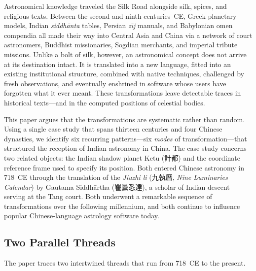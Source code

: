 \documentclass[10pt,a4paper]{article}
\newcommand{\zh}[1]{#1}
\begin{document}
Astronomical knowledge traveled the Silk Road alongside silk, spices, and
religious texts.  Between the second and ninth centuries~CE, Greek planetary
models, Indian \textit{siddh\=anta} tables, Persian \textit{z\={\i}j} manuals,
and Babylonian omen compendia all made their way into Central Asia and China via
a network of court astronomers, Buddhist missionaries, Sogdian merchants, and
imperial tribute missions.  Unlike a bolt of silk, however, an astronomical concept
does not arrive at its destination intact.  It is translated into a new language,
fitted into an existing institutional structure, combined with native techniques,
challenged by fresh observations, and eventually enshrined in software whose users
have forgotten what it ever meant.  These transformations leave detectable traces
in historical texts---and in the computed positions of celestial bodies.

This paper argues that the transformations are systematic rather than random.
Using a single case study that spans thirteen centuries and four Chinese dynasties,
we identify six recurring patterns---six \emph{modes} of transformation---that
structured the reception of Indian astronomy in China.  The case study concerns
two related objects: the Indian shadow planet Ketu (\zh{計都}) and the coordinate
reference frame used to specify its position.  Both entered Chinese astronomy in
718~CE through the translation of the \textit{Jiuzhi li} (\zh{九執曆},
\textit{Nine Luminaries Calendar}) by Gautama Siddh\=artha (\zh{瞿曇悉達}), a
scholar of Indian descent serving at the Tang court.  Both underwent a remarkable
sequence of transformations over the following millennium, and both continue to
influence popular Chinese-language astrology software today.

\subsection*{Two Parallel Threads}

The paper traces two intertwined threads that run from 718~CE to the present.
\end{document}
